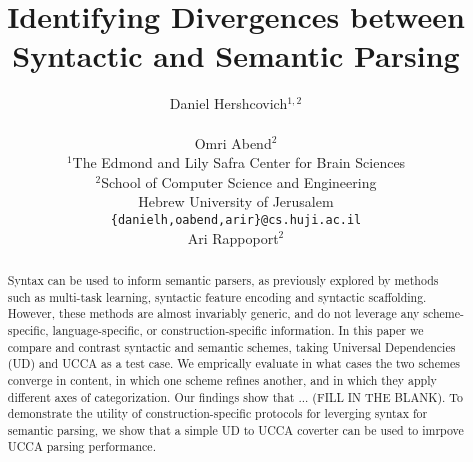 \documentclass[11pt,a4paper]{article}
\title{Identifying Divergences between Syntactic and Semantic Parsing}
\author{Daniel Hershcovich$^{1,2}$ \\
  \\\And
  Omri Abend$^2$ \\
  $^1$The Edmond and Lily Safra Center for Brain Sciences \\
  $^2$School of Computer Science and Engineering \\
  Hebrew University of Jerusalem \\
  \texttt{\{danielh,oabend,arir\}@cs.huji.ac.il}
  \\\And
  Ari Rappoport$^2$
}
\date{}
\begin{document}
\maketitle

\begin{abstract}
  Syntax can be used to inform semantic parsers, as previously explored
  by methods such as  multi-task learning, syntactic feature encoding and syntactic scaffolding.
  However, these methods are almost invariably generic, and do not leverage any
  scheme-specific, language-specific, or construction-specific information.
  In this paper we compare and contrast syntactic and semantic schemes,
  taking Universal Dependencies (UD) and UCCA as a test case.
  We emprically evaluate in what cases the two schemes converge in content,
  in which one scheme refines another, and in which they apply different axes
  of categorization.
  Our findings show that ... (FILL IN THE BLANK).
  To demonstrate the utility of construction-specific protocols
  for leverging syntax for semantic parsing,
  we show that a simple UD to UCCA coverter can be used to imrpove 
  UCCA parsing performance.
\end{abstract}









\end{document}
